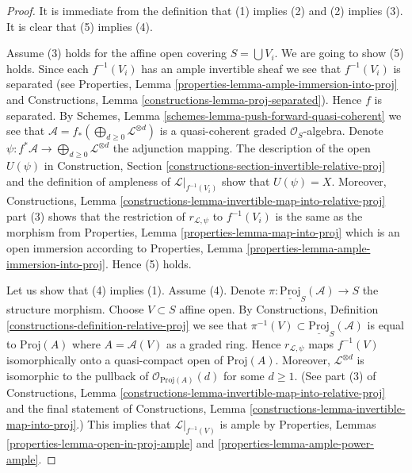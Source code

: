 \begin{proof}
It is immediate from the definition that (1) implies (2) and
(2) implies (3). It is clear that (5) implies (4).

\medskip\noindent
Assume (3) holds for the affine open covering $S = \bigcup V_i$.
We are going to show (5) holds.
Since each $f^{-1}(V_i)$ has an ample invertible sheaf we see
that $f^{-1}(V_i)$ is separated (see
Properties, Lemma \ref{properties-lemma-ample-immersion-into-proj} and
Constructions, Lemma \ref{constructions-lemma-proj-separated}).
Hence $f$ is separated. By
Schemes, Lemma \ref{schemes-lemma-push-forward-quasi-coherent}
we see that $\mathcal{A} = f_*(\bigoplus_{d \geq 0} \mathcal{L}^{\otimes d})$
is a quasi-coherent graded $\mathcal{O}_S$-algebra.
Denote $\psi : f^*\mathcal{A} \to \bigoplus_{d \geq 0} \mathcal{L}^{\otimes d}$
the adjunction mapping.
The description of the open $U(\psi)$ in
Construction, Section \ref{constructions-section-invertible-relative-proj}
and the definition of ampleness
of $\mathcal{L}|_{f^{-1}(V_i)}$ show that $U(\psi) = X$.
Moreover, Constructions,
Lemma \ref{constructions-lemma-invertible-map-into-relative-proj} part (3)
shows that the restriction of $r_{\mathcal{L}, \psi}$ to
$f^{-1}(V_i)$ is the same as the morphism from
Properties, Lemma \ref{properties-lemma-map-into-proj}
which is an open immersion according to
Properties, Lemma \ref{properties-lemma-ample-immersion-into-proj}.
Hence (5) holds.

\medskip\noindent
Let us show that (4) implies (1). Assume (4).
Denote $\pi : \underline{\text{Proj}}_S(\mathcal{A}) \to S$
the structure morphism. Choose $V \subset S$ affine open. By
Constructions, Definition \ref{constructions-definition-relative-proj}
we see that $\pi^{-1}(V) \subset \underline{\text{Proj}}_S(\mathcal{A})$
is equal to $\text{Proj}(A)$ where $A = \mathcal{A}(V)$
as a graded ring. Hence $r_{\mathcal{L}, \psi}$ maps
$f^{-1}(V)$ isomorphically onto
a quasi-compact open of $\text{Proj}(A)$.
Moreover, $\mathcal{L}^{\otimes d}$ is isomorphic to the pullback of
$\mathcal{O}_{\text{Proj}(A)}(d)$ for some $d \geq 1$.
(See part (3) of Constructions,
Lemma \ref{constructions-lemma-invertible-map-into-relative-proj}
and the final statement of Constructions,
Lemma \ref{constructions-lemma-invertible-map-into-proj}.)
This implies that $\mathcal{L}|_{f^{-1}(V)}$ is ample by
Properties, Lemmas \ref{properties-lemma-open-in-proj-ample}
and \ref{properties-lemma-ample-power-ample}.


\end{proof}
